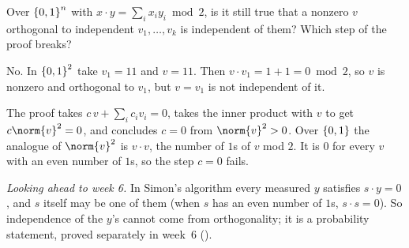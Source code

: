 \begin{exercisebox}
\begin{pproblem}\label{wp:gf2}
    Over $\left\lbrace0,1\right\rbrace^n$ with $x \cdot y = \sum_i x_i y_i \bmod 2$, is it still true that a nonzero
    $v$ orthogonal to independent $v_1, \dots, v_k$ is independent of them? Which step of the
    proof breaks?
\end{pproblem}
\tcblower
\begin{wsolution}
    No. In $\left\lbrace0,1\right\rbrace^2$ take $v_1 = 11$ and $v = 11$. Then $v \cdot v_1 = 1 + 1 = 0 \bmod 2$, so $v$
    is nonzero and orthogonal to $v_1$, but $v = v_1$ is not independent of it.

    The proof takes $c\,v + \sum_i c_i v_i = 0$, takes the inner product with $v$ to get
    $c \norm{v}^2 = 0$, and concludes $c = 0$ from $\norm{v}^2 > 0$. Over $\left\lbrace0,1\right\rbrace$ the analogue
    of $\norm{v}^2$ is $v \cdot v$, the number of $1$s of $v$ mod $2$. It is $0$ for every $v$ with
    an even number of $1$s, so the step $c = 0$ fails.

    \emph{Looking ahead to week 6.} In Simon's algorithm every measured $y$ satisfies $s \cdot y = 0$, and $s$ itself may be one of
    them (when $s$ has an even number of $1$s, $s \cdot s = 0$). So independence of the $y$'s cannot
    come from orthogonality; it is a probability statement, proved separately in week~6
    ().
\end{wsolution}
\end{exercisebox}
